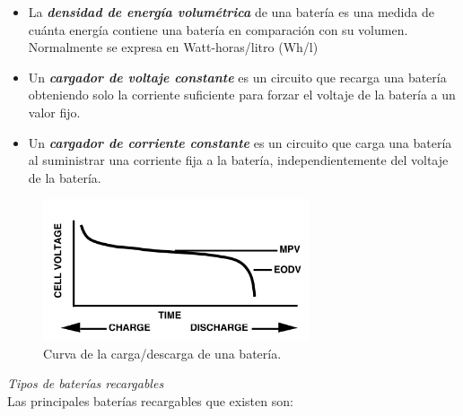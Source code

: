 \documentclass[12pt]{article}
\begin{document}
\begin{itemize}
 		\item La \textit{\textbf{densidad de energía volumétrica}} de una batería es una medida de cuánta energía contiene una batería en comparación con su volumen. Normalmente se expresa en Watt-horas/litro (Wh/l)
 		\item Un \textit{\textbf{cargador de voltaje constante}} es un circuito que recarga una batería obteniendo solo la corriente suficiente para forzar el voltaje de la batería a un valor fijo.
 		\item Un \textit{\textbf{cargador de corriente constante}} es un circuito que carga una batería al suministrar una corriente fija a la batería, independientemente del voltaje de la batería.
	\end{itemize}

	\pagebreak
	
	\begin{figure}[h]
		\begin{center}
			\includegraphics[width=0.7\textwidth]{img/chargeDischargeCurve_TxInst.png}
			\caption{Curva de la carga/descarga de una batería.}
		\end{center}
	\end{figure}

	\pagebreak
	
	
	\noindent \textit{Tipos de baterías recargables}\\
	
	\noindent Las principales baterías recargables que existen son: \\
	
\end{document}
